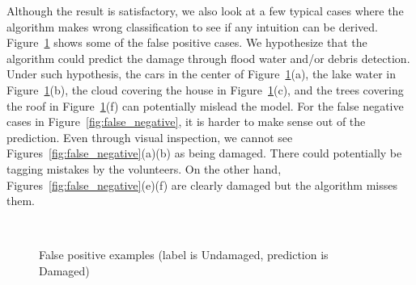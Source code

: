 \documentclass[journal, 12pt, onecolumn,draftclsnofoot]{IEEEtran}
\begin{document}
Although the result is satisfactory, we also look at a few typical cases where the algorithm makes wrong classification to see if any intuition can be derived. Figure~\ref{fig:false_positive} shows some of the false positive cases. We hypothesize that the algorithm could predict the damage through flood water and/or debris detection. Under such hypothesis, the cars in the center of Figure~\ref{fig:false_positive}(a), the lake water in Figure~\ref{fig:false_positive}(b), the cloud covering the house in Figure~\ref{fig:false_positive}(c), and the trees covering the roof in Figure~\ref{fig:false_positive}(f) can potentially mislead the model. For the false negative cases in Figure~\ref{fig:false_negative}, it is harder to make sense out of the prediction. Even through visual inspection, we cannot see Figures~\ref{fig:false_negative}(a)(b) as being damaged. There could potentially be tagging mistakes by the volunteers. On the other hand, Figures~\ref{fig:false_negative}(e)(f) are clearly damaged but the algorithm misses them. 

\begin{figure}[h]{\centering
{}
\\
\caption{\small{False positive examples (label is Undamaged, prediction is Damaged)}}
\label{fig:false_positive}
}
\end{figure}
\end{document}
